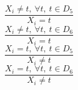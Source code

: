 $$\frac{X_{i} \neq t,~\forall t,~t \in D_{5}}{X_{i}=t}$$ $$\frac{X_{i} \neq t,~\forall t,~t \in D_{6}}{X_{i}=t}$$ $$\frac{X_{i}=t,~\forall t,~t \in D_{5}}{X_{i} \neq t}$$ $$\frac{X_{i}=t,~\forall t,~t \in D_{6}}{X_{i} \neq t}$$ 